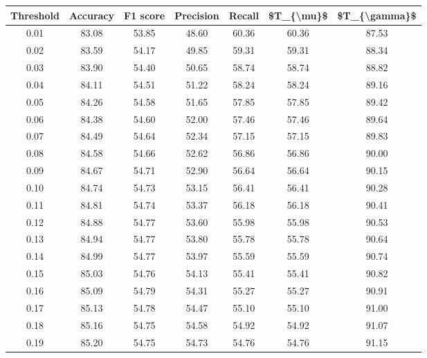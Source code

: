 \begin{tabular}{|c|c|c|c|c|c|c|}
\hline
 Threshold &  Accuracy &  F1 score &  Precision &  Recall &  \$T\_\{\textbackslash mu\}\$ &  \$T\_\{\textbackslash gamma\}\$ \\
\hline
      0.01 &     83.08 &     53.85 &      48.60 &   60.36 &      60.36 &         87.53 \\
      0.02 &     83.59 &     54.17 &      49.85 &   59.31 &      59.31 &         88.34 \\
      0.03 &     83.90 &     54.40 &      50.65 &   58.74 &      58.74 &         88.82 \\
      0.04 &     84.11 &     54.51 &      51.22 &   58.24 &      58.24 &         89.16 \\
      0.05 &     84.26 &     54.58 &      51.65 &   57.85 &      57.85 &         89.42 \\
      0.06 &     84.38 &     54.60 &      52.00 &   57.46 &      57.46 &         89.64 \\
      0.07 &     84.49 &     54.64 &      52.34 &   57.15 &      57.15 &         89.83 \\
      0.08 &     84.58 &     54.66 &      52.62 &   56.86 &      56.86 &         90.00 \\
      0.09 &     84.67 &     54.71 &      52.90 &   56.64 &      56.64 &         90.15 \\
      0.10 &     84.74 &     54.73 &      53.15 &   56.41 &      56.41 &         90.28 \\
      0.11 &     84.81 &     54.74 &      53.37 &   56.18 &      56.18 &         90.41 \\
      0.12 &     84.88 &     54.77 &      53.60 &   55.98 &      55.98 &         90.53 \\
      0.13 &     84.94 &     54.77 &      53.80 &   55.78 &      55.78 &         90.64 \\
      0.14 &     84.99 &     54.77 &      53.97 &   55.59 &      55.59 &         90.74 \\
      0.15 &     85.03 &     54.76 &      54.13 &   55.41 &      55.41 &         90.82 \\
      0.16 &     85.09 &     54.79 &      54.31 &   55.27 &      55.27 &         90.91 \\
      0.17 &     85.13 &     54.78 &      54.47 &   55.10 &      55.10 &         91.00 \\
      0.18 &     85.16 &     54.75 &      54.58 &   54.92 &      54.92 &         91.07 \\
      0.19 &     85.20 &     54.75 &      54.73 &   54.76 &      54.76 &         91.15 \\

\end{tabular}
